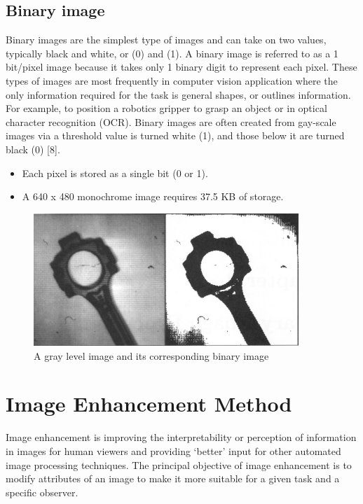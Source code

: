 \subsection{Binary image}
Binary images are the simplest type of images and can take on two values,
typically black and white, or (0) and (1).
A binary image is referred to as a 1 bit/pixel image because it takes only 1
binary digit to represent each pixel.
These types of images are most frequently in computer vision application where the
only information required for the task is general shapes, or outlines information.
For example, to position a robotics gripper to grasp an object or in optical character
recognition (OCR). Binary images are often created from gay-scale images via a threshold
value is turned white (1), and those below it are turned black (0) [8].

        \begin{itemize}
                \item Each pixel is stored as a single bit (0 or 1).
                \item A 640 x 480 monochrome image requires 37.5 KB of storage.
        \end{itemize}

        \begin{figure}[h]
                \centering
                \includegraphics[width=10cm]{chapiter1/figures/binaire.png}
                \setlength{\fboxrule}{2pt}
                \caption{ A gray level image and its corresponding binary image}
        \end{figure}

\section{Image Enhancement Method}\label{sec:image-enhancement-method}
Image enhancement is improving the interpretability or perception of information in images
for human viewers and providing `better' input for other automated image processing techniques.
The principal objective of image enhancement is to modify attributes of an image to make it
more suitable for a given task and a specific observer.

